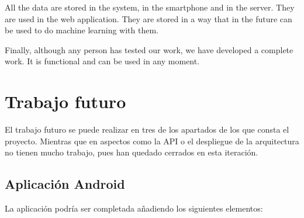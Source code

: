 \documentclass[11pt,spanish]{article}
\begin{document}
All the data are stored in the system, in the smartphone and in the server. They are used in the web application. They are stored in a way that in the future can be used to do machine learning with them.
\newline

Finally, although any person has tested our work, we have developed a complete work. It is functional and can be used in any moment.
\newpage

\section{Trabajo futuro}
El trabajo futuro se puede realizar en tres de los apartados de los que consta el proyecto. Mientras que en aspectos como la API o el despliegue de la arquitectura no tienen mucho trabajo, pues han quedado cerrados en esta iteración.

\subsection{Aplicación Android}
La aplicación podría ser completada añadiendo los siguientes elementos:
\end{document}
